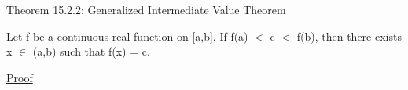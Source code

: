     \vspace{0.5cm}

{ \color{red} Theorem 15.2.2: Generalized Intermediate Value Theorem }

    \begin{adjustbox}{minipage=14cm, right, vspace=0.1cm 0cm}
        Let f be a continuous real function on [a,b]. If f(a) $<$ c $<$ f(b),
        then there exists x $\in$ (a,b) such that f(x) = c.
    \end{adjustbox}

{ \color{magenta} \underline{Proof} }


    \vspace{0.5cm}







